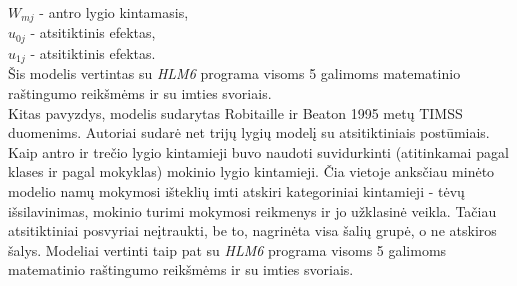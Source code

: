 \documentclass[11pt,a4paper]{article}
\begin{document}
$W_{mj}$ - antro lygio kintamasis, \\
$u_{0j}$ - atsitiktinis efektas,\\
$u_{1j}$ - atsitiktinis efektas.\\
Šis modelis vertintas su \textit{HLM6} programa visoms 5 galimoms matematinio raštingumo reikšmėms ir su imties svoriais.\\
\indent Kitas pavyzdys, modelis sudarytas Robitaille ir Beaton \cite{timssLiet} 1995 metų TIMSS duomenims. Autoriai sudarė net trijų lygių modelį su atsitiktiniais postūmiais. Kaip antro ir trečio lygio kintamieji buvo naudoti suvidurkinti (atitinkamai pagal klases ir pagal mokyklas) mokinio lygio kintamieji. Čia vietoje anksčiau minėto modelio namų mokymosi išteklių imti atskiri kategoriniai kintamieji - tėvų išsilavinimas, mokinio turimi mokymosi reikmenys ir jo užklasinė veikla. Tačiau atsitiktiniai posvyriai neįtraukti, be to, nagrinėta visa šalių grupė, o ne atskiros šalys. Modeliai vertinti taip pat su \textit{HLM6} programa visoms 5 galimoms matematinio raštingumo reikšmėms ir su imties svoriais.
\end{document}
